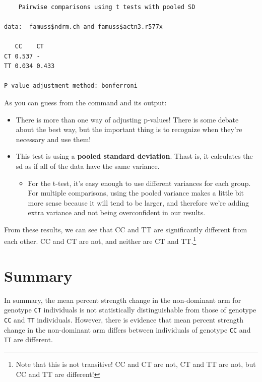 \documentclass[
  letterpaper,
  DIV=11,
  numbers=noendperiod,
  oneside]{scrreprt}
\providecommand{\tightlist}{%
  \setlength{\itemsep}{0pt}\setlength{\parskip}{0pt}}\usepackage{longtable,booktabs,array}
\begin{document}
\begin{verbatim}

    Pairwise comparisons using t tests with pooled SD 

data:  famuss$ndrm.ch and famuss$actn3.r577x 

   CC    CT   
CT 0.537 -    
TT 0.034 0.433

P value adjustment method: bonferroni 
\end{verbatim}

As you can guess from the command and its output:

\begin{itemize}
\tightlist
\item
  There is more than one way of adjusting p-values! There is some debate
  about the best way, but the important thing is to recognize when
  they're necessary and use them!
\item
  This test is using a \textbf{pooled standard deviation}. Thast is, it
  calculates the sd as if all of the data have the same variance.

  \begin{itemize}
  \tightlist
  \item
    For the t-test, it's easy enough to use different variances for each
    group. For multiple comparisons, using the pooled variance makes a
    little bit more sense because it will tend to be larger, and
    therefore we're adding extra variance and not being overconfident in
    our results.
  \end{itemize}
\end{itemize}

From these results, we can see that CC and TT are significantly
different from each other. CC and CT are not, and neither are CT and
TT.\footnote{Note that this is not transitive! CC and CT are not, CT and
  TT are not, but CC and TT are different!}

\hypertarget{summary-10}{%
\section{Summary}\label{summary-10}}

In summary, the mean percent strength change in the non-dominant arm for
genotype \texttt{CT} individuals is not statistically distinguishable
from those of genotype \texttt{CC} and \texttt{TT} individuals. However,
there is evidence that mean percent strength change in the non-dominant
arm differs between individuals of genotype \texttt{CC} and \texttt{TT}
are different.
\end{document}
